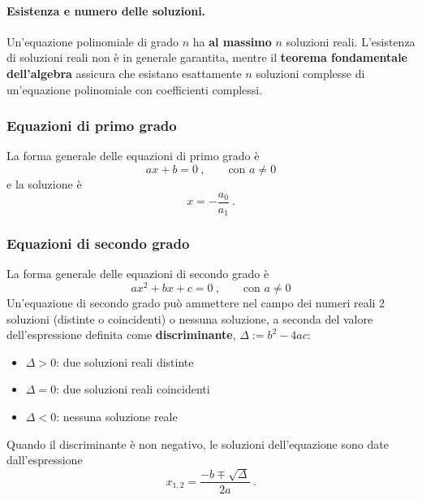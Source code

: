 \paragraph{Esistenza e numero delle soluzioni.} Un'equazione polinomiale di grado $n$ ha \textbf{al massimo} $n$ soluzioni reali. L'esistenza di soluzioni reali non è in generale garantita, mentre il \textbf{teorema fondamentale dell'algebra} assicura che esistano esattamente $n$ soluzioni complesse di un'equazione polinomiale con coefficienti complessi.

\subsubsection{Equazioni di primo grado}
La forma generale delle equazioni di primo grado è
\begin{equation}
    a x + b = 0 \ , \qquad \text{con $a \ne 0$}
\end{equation}
e la soluzione è
\begin{equation}
  x = -\dfrac{a_0}{a_1} \ .
\end{equation}
\subsubsection{Equazioni di secondo grado}
La forma generale delle equazioni di secondo grado è
\begin{equation}
    a x^2 + b x + c = 0 \ , \qquad \text{con $a \ne 0$}
\end{equation}
%
Un'equazione di secondo grado può ammettere nel campo dei numeri reali 2 soluzioni (distinte o coincidenti) o nessuna soluzione, a seconda del valore dell'espressione definita come \textbf{discriminante}, $\Delta := b^2 - 4 a c$:
\begin{itemize}
    \item $\Delta > 0$: due soluzioni reali distinte
    \item $\Delta = 0$: due soluzioni reali coincidenti
    \item $\Delta < 0$: nessuna soluzione reale
\end{itemize}
Quando il discriminante è non negativo, le soluzioni dell'equazione sono date dall'espressione
\begin{equation}
    x_{1,2} = \dfrac{-b \mp \sqrt{\Delta}}{2a} \ .
\end{equation}
%
